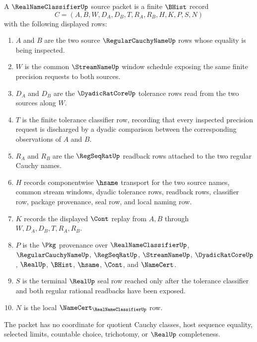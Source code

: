 \begin{definition}
\label{def:real-name-classifier-source}
A $\RealNameClassifierUp$ source packet is a finite $\BHist$ record
$$
C=(A,B,W,D_A,D_B,T,R_A,R_B,H,K,P,S,N)
$$
with the following displayed rows:
\begin{enumerate}
\item $A$ and $B$ are the two source $\RegularCauchyNameUp$ rows whose equality is being inspected.
\item $W$ is the common $\StreamNameUp$ window schedule exposing the same finite precision requests to both sources.
\item $D_A$ and $D_B$ are the $\DyadicRatCoreUp$ tolerance rows read from the two sources along $W$.
\item $T$ is the finite tolerance classifier row, recording that every inspected precision request is discharged by a dyadic comparison between the corresponding observations of $A$ and $B$.
\item $R_A$ and $R_B$ are the $\RegSeqRatUp$ readback rows attached to the two regular Cauchy names.
\item $H$ records componentwise $\hsame$ transport for the two source names, common stream windows, dyadic tolerance rows, readback rows, classifier row, package provenance, seal row, and local naming row.
\item $K$ records the displayed $\Cont$ replay from $A,B$ through $W,D_A,D_B,T,R_A,R_B$.
\item $P$ is the $\Pkg$ provenance over $\RealNameClassifierUp$, $\RegularCauchyNameUp$, $\RegSeqRatUp$, $\StreamNameUp$, $\DyadicRatCoreUp$, $\RealUp$, $\BHist$, $\hsame$, $\Cont$, and $\NameCert$.
\item $S$ is the terminal $\RealUp$ seal row reached only after the tolerance classifier and both regular rational readbacks have been exposed.
\item $N$ is the local $\NameCert_{\RealNameClassifierUp}$ row.
\end{enumerate}
The packet has no coordinate for quotient Cauchy classes, host sequence equality, selected limits, countable choice, trichotomy, or $\RealUp$ completeness.
\end{definition}

